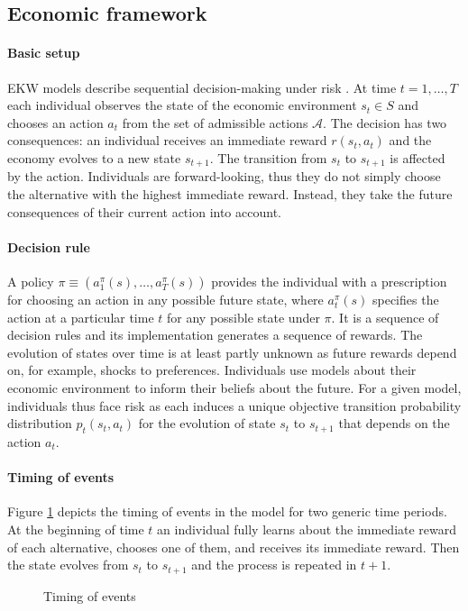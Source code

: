 \subsection{Economic framework}
\paragraph{Basic setup} EKW models describe sequential decision-making under risk \citep{Machina.2014,Gilboa.2009}. At time $t = 1, \hdots, T$ each individual observes the state of the economic environment $s_t\in S$ and chooses an action $a_t$ from the set of admissible actions $\mathcal{A}$. The decision has two consequences: an individual receives an immediate reward $r(s_t, a_t)$ and the economy evolves to a new state $s_{t + 1}$. The transition from $s_t$ to $s_{t + 1}$ is affected by the action.  Individuals are forward-looking, thus they do not simply choose the alternative with the highest immediate reward. Instead, they take the future consequences of their current action into account.

\paragraph{Decision rule} A policy $\pi \equiv(a^\pi_1(s), \hdots, a^\pi_T(s))$ provides the individual with a prescription for choosing an action in any possible future state, where $a^\pi_t(s)$ specifies the action at a particular time $t$ for any possible state under $\pi$. It is a sequence of decision rules and its implementation generates a sequence of rewards.  The evolution of states over time is at least partly unknown as future rewards depend on, for example, shocks to preferences. Individuals use models about their economic environment to inform their beliefs about the future. For a given model, individuals thus face risk as each induces a unique objective transition probability distribution $p_t(s_t, a_t)$ for the evolution of state $s_t$ to $s_{t + 1}$ that depends on the action $a_t$.

\paragraph{Timing of events} Figure \ref{Timing} depicts the timing of events in the model for two generic time periods. At the beginning of time $t$ an individual fully learns about the immediate reward of each alternative, chooses one of them, and receives its immediate reward. Then the state evolves from $s_t$ to $s_{t + 1}$ and the process is repeated in $t + 1$.
%
\begin{figure}\caption{Timing of events}\label{Timing}\vspace{1.0cm}\centering

\end{figure}
%
